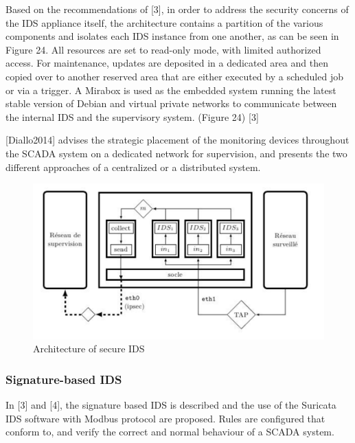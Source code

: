 \documentclass[12pt,]{article}
\begin{document}
Based on the recommendations of {[}3{]}, in order to address the
security concerns of the IDS appliance itself, the architecture contains
a partition of the various components and isolates each IDS instance
from one another, as can be seen in Figure 24. All resources are set to
read-only mode, with limited authorized access. For maintenance, updates
are deposited in a dedicated area and then copied over to another
reserved area that are either executed by a scheduled job or via a
trigger. A Mirabox is used as the embedded system running the latest
stable version of Debian and virtual private networks to communicate
between the internal IDS and the supervisory system. (Figure 24) {[}3{]}

{[}Diallo2014{]} advises the strategic placement of the monitoring
devices throughout the SCADA system on a dedicated network for
supervision, and presents the two different approaches of a centralized
or a distributed system.

\begin{figure}

{\centering \includegraphics{thesis_files/figure-latex/unnamed-chunk-35-1} 

}

\caption{Architecture of secure IDS }\label{fig:unnamed-chunk-35}
\end{figure}

\subsubsection{Signature-based IDS}\label{signature-based-ids}

In {[}3{]} and {[}4{]}, the signature based IDS is described and the use
of the Suricata IDS software with Modbus protocol are proposed. Rules
are configured that conform to, and verify the correct and normal
behaviour of a SCADA system.
\end{document}
